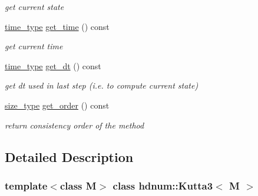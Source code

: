 \begin{DoxyCompactItemize}
\begin{DoxyCompactList}\small\item\em get current state \item\end{DoxyCompactList}\item 
\hypertarget{classhdnum_1_1Kutta3_a11598389a3a0bd0403b2906c147640e2}{
\hyperlink{classhdnum_1_1Kutta3_a0055d10b545c5cf60a16fd3a88a6042e}{time\_\-type} \hyperlink{classhdnum_1_1Kutta3_a11598389a3a0bd0403b2906c147640e2}{get\_\-time} () const }
\label{classhdnum_1_1Kutta3_a11598389a3a0bd0403b2906c147640e2}

\begin{DoxyCompactList}\small\item\em get current time \item\end{DoxyCompactList}\item 
\hypertarget{classhdnum_1_1Kutta3_a365f2f78d21f7db184a88665ac1f9b58}{
\hyperlink{classhdnum_1_1Kutta3_a0055d10b545c5cf60a16fd3a88a6042e}{time\_\-type} \hyperlink{classhdnum_1_1Kutta3_a365f2f78d21f7db184a88665ac1f9b58}{get\_\-dt} () const }
\label{classhdnum_1_1Kutta3_a365f2f78d21f7db184a88665ac1f9b58}

\begin{DoxyCompactList}\small\item\em get dt used in last step (i.e. to compute current state) \item\end{DoxyCompactList}\item 
\hypertarget{classhdnum_1_1Kutta3_a47f10303531b80d34d84cbae496b0543}{
\hyperlink{classhdnum_1_1Kutta3_aa219675a459b3d48c8ac301a1f6d712b}{size\_\-type} \hyperlink{classhdnum_1_1Kutta3_a47f10303531b80d34d84cbae496b0543}{get\_\-order} () const }
\label{classhdnum_1_1Kutta3_a47f10303531b80d34d84cbae496b0543}

\begin{DoxyCompactList}\small\item\em return consistency order of the method \item\end{DoxyCompactList}\end{DoxyCompactItemize}


\subsection{Detailed Description}
\subsubsection*{template$<$class M$>$ class hdnum::Kutta3$<$ M $>$}

